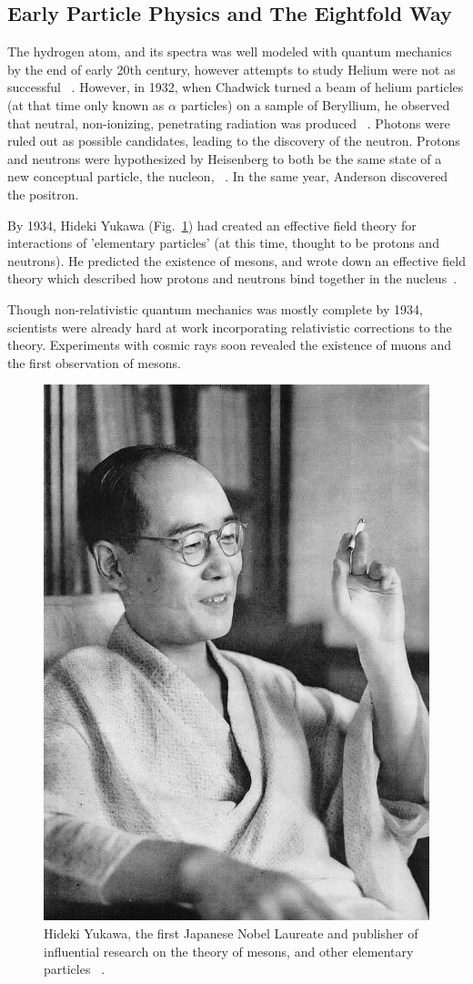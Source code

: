 \clearpage
\subsection{Early Particle Physics and The Eightfold Way}

The hydrogen atom, and its spectra was well modeled with quantum mechanics by
the end of early 20th century, however attempts to study Helium were not as
successful ~\needcite{}. However, in 1932,  when Chadwick turned a beam of
helium particles (at that time only known as $\alpha$ particles) on a sample of
Beryllium, he observed that neutral, non-ionizing, penetrating radiation was
produced ~\cite{KraussParticleHistory}. Photons were ruled out as possible
candidates, leading to the discovery of the neutron. Protons and neutrons were
hypothesized by Heisenberg to both be the same state of a new conceptual
particle, the nucleon, ~\cite{Heisenberg1952}. In the same year, Anderson
discovered the positron. 

By 1934, Hideki Yukawa (Fig.~\ref{fig:hidekiyukawa}) had created an effective
field theory for interactions of 'elementary particles' (at this time, thought
to be protons and neutrons). He predicted the existence of mesons, and wrote
down an effective field theory which described how protons and neutrons bind
together in the nucleus~\cite{Yukawa1935}. 

Though non-relativistic quantum mechanics was mostly complete by 1934,
scientists were already hard at work incorporating relativistic corrections to
the theory. Experiments with cosmic rays soon revealed the existence of muons
and the first observation of mesons.

\begin{figure}[ht]
	\begin{center}
		\includegraphics[width=0.5\linewidth]{../Chapter2/fig/hidekiyukawa.jpg}
	\caption{
		Hideki Yukawa, the first Japanese Nobel Laureate and publisher of influential
		research on the theory of mesons, and other elementary particles
		~\cite{YukawaPhoto1952}.
	}
	\label{fig:hidekiyukawa}
\end{center}
\end{figure}

